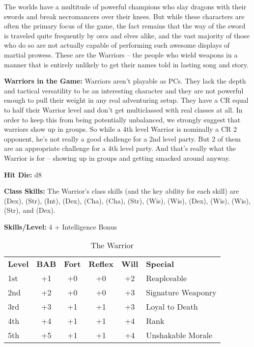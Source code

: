 
The worlds have a multitude of powerful champions who slay dragons with their swords and break necromancers over their knees. But while these characters are often the primary focus of the game, the fact remains that the way of the sword is traveled quite frequently by orcs and elves alike, and the vast majority of those who do so are not actually capable of performing such awesome displays of martial prowess. These are the Warriors -- the people who wield weapons in a manner that is entirely unlikely to get their names told in lasting song and story.

\textbf{Warriors in the Game:} Warriors aren't playable as PCs. They lack the depth and tactical versatility to be an interesting character and they are not powerful enough to pull their weight in any real adventuring setup. They have a CR equal to half their Warrior level and don't get multiclassed with real classes at all. In order to keep this from being potentially unbalanced, we strongly suggest that warriors show up in groups. So while a 4th level Warrior is nominally a CR 2 opponent, he's not really a good challenge for a 2nd level party. But 2 of them are an appropriate challenge for a 4th level party. And that's really what the Warrior is for -- showing up in groups and getting smacked around anyway.

\textbf{Hit Die:} d8

\textbf{Class Skills:} The Warrior's class skills (and the key ability for each skill) are  (Dex),  (Str),  (Int),  (Dex),  (Cha),  (Cha),  (Str),  (Wis),  (Wis),  (Dex),  (Wis),  (Wis),  (Str), and  (Dex).

\textbf{Skills/Level:} 4 + Intelligence Bonus

\begin{table}[htb]
\caption{The Warrior}
\centering
\begin{tabular}{l c c c c l}
\textbf{Level} & \textbf{BAB} & \textbf{Fort} & \textbf{Reflex} & \textbf{Will} & \textbf{Special}\\
1st & +1 & +0 & +0 & +2 & Reaplceable\\
2nd & +2 & +0 & +0 & +3 & Signature Weaponry\\
3rd & +3 & +1 & +1 & +3 & Loyal to Death\\
4th & +4 & +1 & +1 & +4 & Rank\\
5th & +5 & +1 & +1 & +4 & Unshakable Morale\\
\end{tabular}
\end{table}

